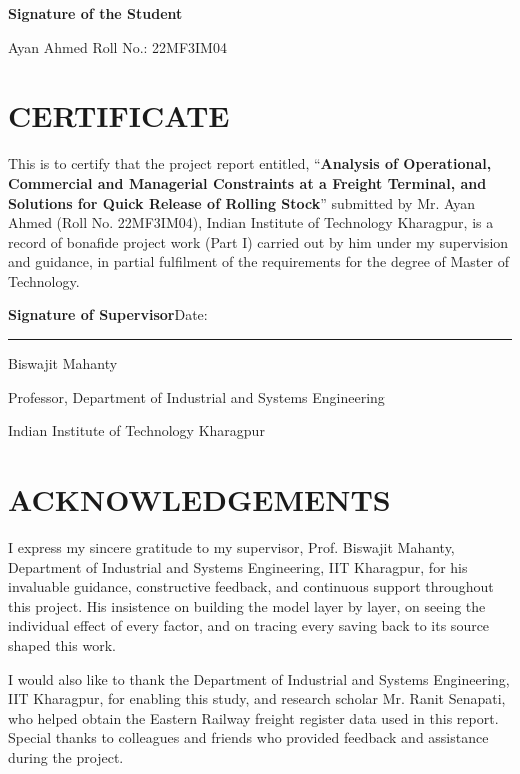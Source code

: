 \documentclass[12pt,a4paper]{report}
\begin{document}
\vspace{2.5cm}
\noindent \textbf{Signature of the Student}\par
\vspace{1cm}
\noindent Ayan Ahmed \hfill Roll No.: 22MF3IM04

\newpage
\thispagestyle{empty}
\section*{CERTIFICATE}
\noindent This is to certify that the project report entitled, ``\textbf{Analysis of Operational, Commercial and Managerial Constraints at a Freight Terminal, and Solutions for Quick Release of Rolling Stock}'' submitted by Mr. Ayan Ahmed (Roll No. 22MF3IM04), Indian Institute of Technology Kharagpur, is a record of bonafide project work (Part I) carried out by him under my supervision and guidance, in partial fulfilment of the requirements for the degree of Master of Technology.

\vspace{2cm}
\noindent \textbf{Signature of Supervisor}\hfill Date: \rule{4cm}{0.4pt}\par
\vspace{0.4cm}
\noindent Biswajit Mahanty\par
\noindent Professor, Department of Industrial and Systems Engineering\par
\noindent Indian Institute of Technology Kharagpur

\newpage
\thispagestyle{empty}
\section*{ACKNOWLEDGEMENTS}
\noindent I express my sincere gratitude to my supervisor, Prof. Biswajit Mahanty, Department of Industrial and Systems Engineering, IIT Kharagpur, for his invaluable guidance, constructive feedback, and continuous support throughout this project. His insistence on building the model layer by layer, on seeing the individual effect of every factor, and on tracing every saving back to its source shaped this work.

\vspace{1em}
\noindent I would also like to thank the Department of Industrial and Systems Engineering, IIT Kharagpur, for enabling this study, and research scholar Mr. Ranit Senapati, who helped obtain the Eastern Railway freight register data used in this report. Special thanks to colleagues and friends who provided feedback and assistance during the project.
\end{document}
